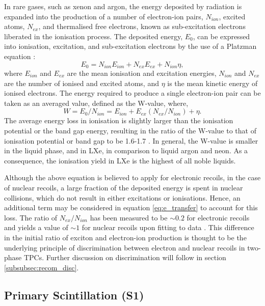 In rare gases, such as xenon and argon, the energy deposited by radiation is expanded into the production of a number of electron-ion pairs, $N_{ion}$, excited atoms, $N_{ex}$, and thermalised free electrons, known as sub-excitation electrons liberated in the ionisation process. The deposited energy, $E_{0}$, can be expressed into ionisation, excitation, and sub-excitation electrons by the use of a Platzman equation \cite{Platzman, xenon_physics}:
%
\begin{equation} \label{eq:e_transfer}
    E_{0} = N_{ion}E_{ion} + N_{ex}E_{ex} + N_{ion}\eta,
\end{equation} 
%
where $E_{ion}$ and $E_{ex}$ are the mean ionisation and excitation energies, $N_{ion}$ and $N_{ex}$ are the number of ionised and excited atoms, and $\eta$ is the mean kinetic energy of ionised electrons. The energy required to produce a single electron-ion pair can be taken as an averaged value, defined as the W-value, where,
%
\begin{equation} \label{eq:w_value}
    W = E_{0}/N_{ion} = E_{ion} + E_{ex}(N_{ex}/N_{ion}) + \eta.
\end{equation} 
%
The average energy loss in ionisation is slightly larger than the ionisation potential or the band gap energy, resulting in the ratio of the W-value to that of ionisation potential or band gap to be 1.6-1.7 \cite{PhysRevA.48.1313}. In general, the W-value is smaller in the liquid phase, and in LXe, in comparison to liquid argon and neon. As a consequence, the ionisation yield in LXe is the highest of all noble liquids.

Although the above equation is believed to apply for electronic recoils, in the case of nuclear recoils, a large fraction of the deposited energy is spent in nuclear collisions, which do not result in either excitations or ionisations. Hence, an additional term may be considered in equation \ref{eq:e_transfer} to account for this loss. The ratio of $N_{ex}/N_{ion}$ has been measured to be $\sim0.2$ for electronic recoils and yields a value of $\sim1$ for nuclear recoils upon fitting to data \cite{xenon_physics, Dahl}. This difference in the initial ratio of exciton and electron-ion production is thought to be the underlying principle of discrimination between electron and nuclear recoils in two-phase TPCs. Further discussion on discrimination will follow in section \ref{subsubsec:recom_disc}.


\subsection{Primary Scintillation (S1)}
\label{subsec:s1}

